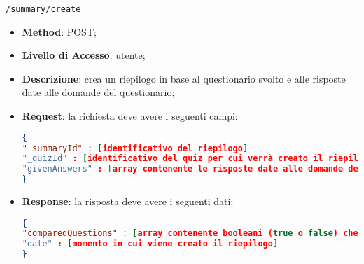 \item \texttt{/summary/create}
		\begin{itemize}
			\item \textbf{Method}: POST;
			\item \textbf{Livello di Accesso}: utente;
			\item \textbf{Descrizione}: crea un riepilogo in base al questionario svolto e alle risposte date alle domande del questionario;
			\item \textbf{Request}: la richiesta deve avere i seguenti campi:
\begin{lstlisting}[language=json,firstnumber=1]
{
"_summaryId" : [identificativo del riepilogo]
"_quizId" : [identificativo del quiz per cui verrà creato il riepilogo]
"givenAnswers" : [array contenente le risposte date alle domande del questionario svolto]
}
\end{lstlisting}
			\item \textbf{Response}: la risposta deve avere i seguenti dati:
\begin{lstlisting}[language=json,firstnumber=1]
{
"comparedQuestions" : [array contenente booleani (true o false) che definiscono se le risposte date alle domande del questionario sono corrette o meno]
"date" : [momento in cui viene creato il riepilogo]
}
\end{lstlisting}
		\end{itemize}